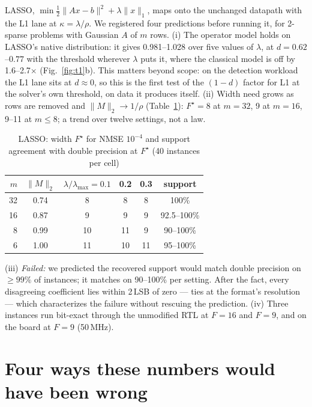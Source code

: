 \documentclass[conference]{IEEEtran}
\begin{document}
LASSO, $\min\tfrac12\lVert Ax-b\rVert^2+\lambda\lVert x\rVert_1$, maps onto the
unchanged datapath with the L1 lane at $\kappa=\lambda/\rho$. We registered four
predictions before running it, for 2-sparse problems with Gaussian $A$ of $m$
rows. (i) The operator model holds on LASSO's native distribution: it gives
0.981--1.028 over five values of $\lambda$, at $d=0.62$--$0.77$ with the
threshold wherever $\lambda$ puts it, where the classical model is off by
1.6--2.7$\times$ (Fig.~\ref{fig:t1}b). This matters beyond scope: on the
detection workload the L1 lane sits at $d\approx0$, so this is the first test
of the $(1-d)$ factor for L1 at the solver's own threshold, on data it
produces itself. (ii) Width
need grows as rows are removed and $\lVert M\rVert_2\to1/\rho$ (Table~\ref{tab:lasso}):
$F^\star=8$ at $m=32$, 9 at $m=16$, 9--11 at $m\le8$; a trend over twelve
settings, not a law.

\begin{table}[t]
\centering\footnotesize\setlength{\tabcolsep}{4pt}
\caption{LASSO: width $F^\star$ for NMSE $10^{-4}$ and support agreement with
double precision at $F^\star$ (40 instances per cell)}
\label{tab:lasso}
\begin{tabular}{rccccc}
\toprule
$m$ & $\lVert M\rVert_2$ & $\lambda/\lambda_{\max}=0.1$ & 0.2 & 0.3 & support \\
\midrule
32 & 0.74 & 8  & 8  & 8  & 100\% \\
16 & 0.87 & 9  & 9  & 9  & 92.5--100\% \\
8  & 0.99 & 10 & 11 & 9  & 90--100\% \\
6  & 1.00 & 11 & 10 & 11 & 95--100\% \\
\bottomrule
\end{tabular}
\end{table} (iii) \emph{Failed:} we predicted the
recovered support would match double precision on $\ge99\%$ of instances; it
matches on 90--100\% per setting. After the fact, every disagreeing coefficient
lies within 2\,LSB of zero --- ties at the format's resolution --- which
characterizes the failure without rescuing the prediction. (iv) Three
instances run bit-exact through the unmodified RTL at $F=16$ and $F=9$, and on
the board at $F=9$ (50\,MHz).

\section{Four ways these numbers would have been wrong}
\label{sec:discipline}
\end{document}
